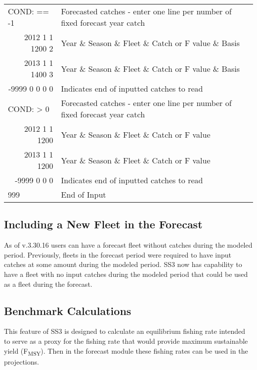 \begin{landscape}
{\begin{longtable}{p{2cm} p{7cm} p{12cm}}
  \hline
  \multicolumn{1}{l}{COND: == -1} & \multicolumn{2}{l}{Forecasted catches - enter one line per number of fixed forecast year catch} \Tstrut\\
  \multicolumn{1}{r}{2012 1 1 1200 2} & \multicolumn{2}{l}{Year \& Season \& Fleet \& Catch or F value \& Basis} \\
  \multicolumn{1}{r}{2013 1 1 1400 3} & \multicolumn{2}{l}{Year \& Season \& Fleet \& Catch or F value \& Basis} \\
  \multicolumn{1}{r}{-9999 0 0 0 0} & \multicolumn{2}{l}{Indicates end of inputted catches to read} \Bstrut\\

  \multicolumn{1}{l}{COND: > 0} & \multicolumn{2}{l}{Forecasted catches - enter one line per number of fixed forecast year catch} \Tstrut\\
  \multicolumn{1}{r}{2012 1 1 1200} & \multicolumn{2}{l}{Year \& Season \& Fleet \& Catch or F value} \\
  \multicolumn{1}{r}{2013 1 1 1200} & \multicolumn{2}{l}{Year \& Season \& Fleet \& Catch or F value} \\
  \multicolumn{1}{r}{-9999 0 0 0} & \multicolumn{2}{l}{Indicates end of inputted catches to read} \Bstrut\\

  \hline
  999 & End of Input & \Bstrut\\

  \end{longtable}}
\end{landscape}

\subsection{Including a New Fleet in the Forecast}
As of v.3.30.16 users can have a forecast fleet without catches during the modeled period. Previously, fleets in the forecast period were required to have input catches at some amount during the modeled period. SS3 now has capability to have a fleet with no input catches during the modeled period that could be used as a fleet during the forecast.

\hypertarget{Benchmark}{}
\subsection{Benchmark Calculations}
This feature of SS3 is designed to calculate an equilibrium fishing rate intended to serve as a proxy for the fishing rate that would provide maximum sustainable yield (F\textsubscript{MSY}). Then in the forecast module these fishing rates can be used in the projections.

